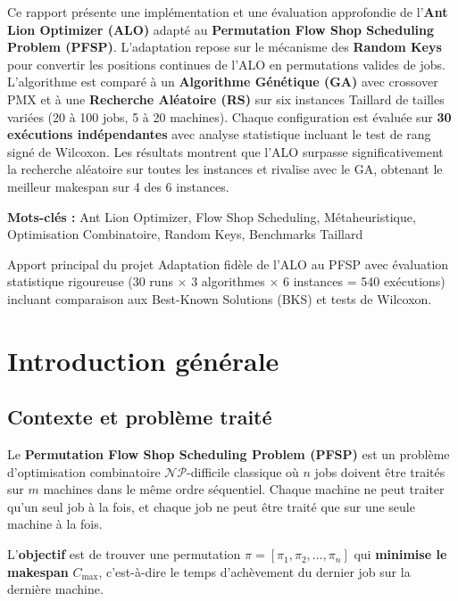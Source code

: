 \documentclass[12pt,a4paper,twoside]{report}
\begin{document}
Ce rapport présente une implémentation et une évaluation approfondie de l'\textbf{Ant Lion Optimizer (ALO)} \cite{mirjalili2015} adapté au \textbf{Permutation Flow Shop Scheduling Problem (PFSP)}. L'adaptation repose sur le mécanisme des \textbf{Random Keys} pour convertir les positions continues de l'ALO en permutations valides de jobs. L'algorithme est comparé à un \textbf{Algorithme Génétique (GA)} avec crossover PMX et à une \textbf{Recherche Aléatoire (RS)} sur six instances Taillard de tailles variées (20 à 100 jobs, 5 à 20 machines). Chaque configuration est évaluée sur \textbf{30 exécutions indépendantes} avec analyse statistique incluant le test de rang signé de Wilcoxon. Les résultats montrent que l'ALO surpasse significativement la recherche aléatoire sur toutes les instances et rivalise avec le GA, obtenant le meilleur makespan sur 4 des 6 instances.

\vspace{0.4cm}
\noindent\textbf{Mots-clés :} Ant Lion Optimizer, Flow Shop Scheduling, Métaheuristique, Optimisation Combinatoire, Random Keys, Benchmarks Taillard

\begin{infobox}{Apport principal du projet}
Adaptation fidèle de l'ALO au PFSP avec évaluation statistique rigoureuse (30 runs $\times$ 3 algorithmes $\times$ 6 instances = 540 exécutions) incluant comparaison aux Best-Known Solutions (BKS) et tests de Wilcoxon.
\end{infobox}

\chapter{Introduction générale}

\section{Contexte et problème traité}

Le \textbf{Permutation Flow Shop Scheduling Problem (PFSP)} est un problème d'optimisation combinatoire $\mathcal{NP}$-difficile classique où $n$ jobs doivent être traités sur $m$ machines dans le même ordre séquentiel. Chaque machine ne peut traiter qu'un seul job à la fois, et chaque job ne peut être traité que sur une seule machine à la fois.

L'\textbf{objectif} est de trouver une permutation $\pi = [\pi_1, \pi_2, \dots, \pi_n]$ qui \textbf{minimise le makespan} $C_{\max}$, c'est-à-dire le temps d'achèvement du dernier job sur la dernière machine.
\end{document}
